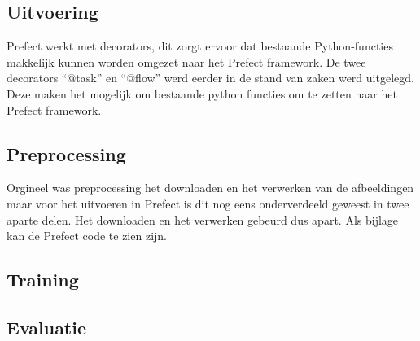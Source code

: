 \subsection{Uitvoering}
Prefect werkt met decorators, dit zorgt ervoor dat bestaande Python-functies makkelijk kunnen worden omgezet naar het Prefect framework. De twee decorators ``@task'' en ``@flow'' werd  eerder in de stand van zaken werd uitgelegd.
Deze maken het mogelijk om bestaande python functies om te zetten naar het Prefect framework.
\subsection{Preprocessing}
Orgineel was preprocessing het downloaden en het verwerken van de afbeeldingen maar voor het uitvoeren in Prefect is dit nog eens onderverdeeld geweest in twee aparte delen.
Het downloaden en het verwerken gebeurd dus apart. Als bijlage kan de Prefect code te zien zijn.
\subsection{Training}

\subsection{Evaluatie}




